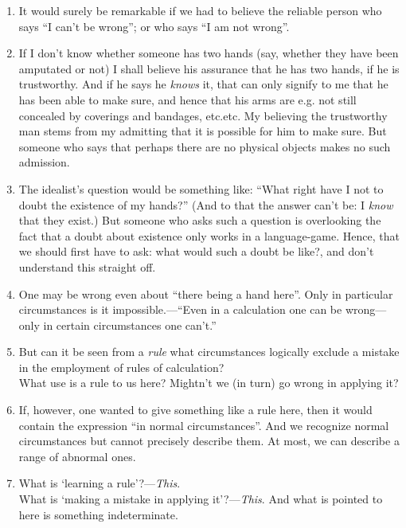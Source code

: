 \documentclass{book}
\begin{document}
\begin{enumerate}
\item
It would surely be remarkable if we had to believe the reliable person who says
``I can't be wrong''; or who says ``I am not wrong''.

\item
If I don't know whether someone has two hands (say, whether they have been
amputated or not) I shall believe his assurance that he has two hands, if he is
trustworthy. And if he says he \emph{knows} it, that can only signify to me
that he has been able to make sure, and hence that his arms are e.g. not still
concealed by coverings and bandages, etc.etc. My believing the trustworthy man
stems from my admitting that it is possible for him to make sure. But someone
who says that perhaps there are no physical objects makes no such admission.

\item
The idealist's question would be something like: ``What right have I not to
doubt the existence of my hands?'' (And to that the answer can't be: I
\emph{know} that they exist.) But someone who asks such a question is
overlooking the fact that a doubt about existence only works in a
language-game. Hence, that we should first have to ask: what would such a doubt
be like?, and don't understand this straight off.

\item
One may be wrong even about ``there being a hand here''. Only in particular
circumstances is it impossible.---``Even in a calculation one can be
wrong---only in certain circumstances one can't.''

\item
But can it be seen from a \emph{rule} what circumstances logically exclude a
mistake in the employment of rules of calculation? \\
What use is a rule to us here?  Mightn't we (in turn) go wrong in applying it?

\item
If, however, one wanted to give something like a rule here, then it would
contain the expression ``in normal circumstances''. And we recognize normal
circumstances but cannot precisely describe them. At most, we can describe a
range of abnormal ones.

\item
What is `learning a rule'?---\emph{This}. \\
What is `making a mistake in applying it'?---\emph{This}. And what is pointed
to here is something indeterminate.


\end{enumerate}
\end{document}
